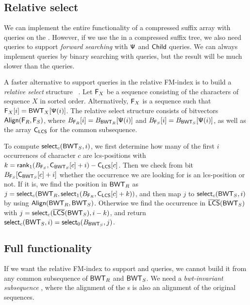 \subsection{Relative select}

We can implement the entire functionality of a compressed suffix array with
\rank{} queries on the \BWT. However, if we use the \CSA{} in a compressed
suffix tree, we also need \select{} queries to support \emph{forward
searching} with $\mathsf{\Psi}$ and $\mathsf{Child}$ queries. We can always implement
\select{} queries by binary searching with \rank{} queries, but the result
will be much slower than the \rank{} queries.

A faster alternative to support \select{} queries in the relative FM-index
is to build a \emph{relative select} structure \rselect{}~\cite{Boucher2015}.
Let $\mathsf{F}_{X}$ be a sequence consisting of the characters of sequence $X$ in
sorted order. Alternatively, $\mathsf{F}_{X}$ is a sequence such that $\mathsf{F}_{X}[i] =
\mathsf{BWT}_{X}[\mathsf{\Psi}(i)]$. The relative select structure consists of bitvectors
$\mathsf{Align}(\mathsf{F}_{R}, \mathsf{F}_{S})$, where $B_{\mathsf{F}_{R}}[i] = B_{\mathsf{BWT}_{R}}[\mathsf{\Psi}(i)]$ and
$B_{\mathsf{F}_{S}}[i] = B_{\mathsf{BWT}_{S}}[\mathsf{\Psi}(i)]$, as well as the \C{} array
$\mathsf{C}_{\mathsf{LCS}}$ for the common subsequence.

To compute $\mathsf{select}_{c}(\mathsf{BWT}_{S}, i)$, we first determine how many of
the first $i$ occurrences of character $c$ are lcs-positions with $k =
\mathsf{rank}_{1}(B_{\mathsf{F}_{S}}, \mathsf{C}_{\mathsf{BWT}_{S}}[c] + i) - \mathsf{C}_{\mathsf{LCS}}[c]$. Then we check
from bit $B_{\mathsf{F}_{S}}[\mathsf{C}_{\mathsf{BWT}_{S}}[c] + i]$ whether the occurrence we are
looking for is an lcs-position or not. If it is,
we find the position in $\mathsf{BWT}_{R}$ as $j = \mathsf{select}_{c}(\mathsf{BWT}_{R},
\mathsf{select}_{1}(B_{\mathsf{F}_{R}}, \mathsf{C}_{\mathsf{LCS}}[c] + k))$, and then map $j$ to
$\mathsf{select}_{c}(\mathsf{BWT}_{S}, i)$ by using $\mathsf{Align}(\mathsf{BWT}_{R}, \mathsf{BWT}_{S})$. Otherwise we
find the occurrence in $\overline{ \mathsf{LCS} }(\mathsf{BWT}_{S})$ with $j = \mathsf{select}_{c}(\overline{ \mathsf{LCS} }(\mathsf{BWT}_{S}),
i-k)$, and return $\mathsf{select}_{c}(\mathsf{BWT}_{S}, i) = \mathsf{select}_{0}(B_{\mathsf{BWT}_{S}}, j)$.

\subsection{Full functionality}

If we want the relative FM-index to support \locate{} and \extract{} queries,
we cannot build it from any common subsequence of $\mathsf{BWT}_{R}$ and $\mathsf{BWT}_{S}$.
We need a \emph{bwt-invariant subsequence} \cite{Belazzougui2014}, where the
alignment of the \BWT{}s is also an alignment of the original sequences.

